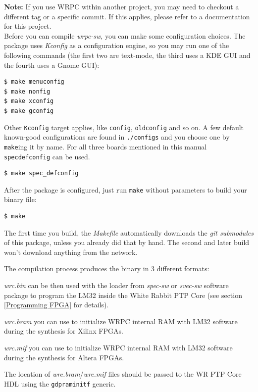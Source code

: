 \documentclass[a4paper, 12pt]{article}
\renewcommand{\_}{\underscore\allowbreak}
\newcommand{\code}[1]{\texttt{#1}}
\begin{document}
\textbf{Note:} If you use WRPC within another project, you may need to checkout
a different tag or a specific commit. If this applies, please refer to a
documentation for this project.\\

Before you can compile \textit{wrpc-sw}, you can make some configuration
choices. The package uses \textit{Kconfig} as a configuration engine, so you may
run one of the following commands (the first two are text-mode, the third uses
a KDE GUI and the fourth uses a Gnome GUI):
\begin{lstlisting}
$ make menuconfig
$ make nonfig
$ make xconfig
$ make gconfig
\end{lstlisting}

Other \code{Kconfig} target applies, like \code{config}, \code{oldconfig}
and so on. A few default known-good configurations are found in
\texttt{./configs} and you choose one by \code{make}ing it by name. For all
three boards mentioned in this manual \code{spec\_defconfig} can be used.
\begin{lstlisting}
$ make spec_defconfig
\end{lstlisting}

After the package is configured, just run \code{make} without parameters to
build your binary file:
\begin{lstlisting}
$ make
\end{lstlisting}

The first time you build, the \textit{Makefile} automatically downloads
the \textit{git submodules} of this package, unless you already did that
by hand. The second and later build won't download anything
from the network.

The compilation process produces the binary in 3 different formats:
\begin{itemize*}
  \item \textit{wrc.bin} can be then used with the loader from \textit{spec-sw}
    or \textit{svec-sw} software package to program the LM32 inside the White
    Rabbit PTP Core (see section \ref{Programming FPGA} for details).
  \item \textit{wrc.bram} you can use to initialize WRPC internal RAM with LM32
    software during the synthesis for Xilinx FPGAs.
  \item \textit{wrc.mif} you can use to initialize WRPC internal RAM with LM32
    software during the synthesis for Altera FPGAs.
\end{itemize*}
The location of \textit{wrc.bram}/\textit{wrc.mif} files should be passed to the
WR PTP Core HDL using the \texttt{g\_dpram\_initf} generic.
\end{document}
